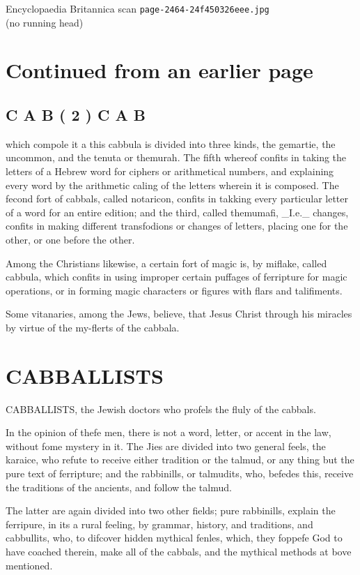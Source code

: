 \documentclass{article}
\begin{document}
\begin{center}
{\Large Encyclopaedia Britannica scan \texttt{page-2464-24f450326eee.jpg}}\\[0.5em]
(no running head)
\end{center}
\section*{Continued from an earlier page}
\subsection*{C A B ( 2 ) C A B}
which compole it a this cabbula is divided into three kinds, the gemartie, the uncommon, and the tenuta or themurah. The fifth whereof confits in taking the letters of a Hebrew word for ciphers or arithmetical numbers, and explaining every word by the arithmetic caling of the letters wherein it is composed. The fecond fort of cabbals, called notaricon, confits in takking every particular letter of a word for an entire edition; and the third, called themumafi, \_I.e.\_ changes, confits in making different transfodions or changes of letters, placing one for the other, or one before the other.

Among the Christians likewise, a certain fort of magic is, by miflake, called cabbula, which confits in using improper certain puffages of ferripture for magic operations, or in forming magic characters or figures with flars and talifiments.

Some vitanaries, among the Jews, believe, that Jesus Christ through his miracles by virtue of the my-flerts of the cabbala.

\section*{CABBALLISTS}
CABBALLISTS, the Jewish doctors who profels the fluly of the cabbals.

In the opinion of thefe men, there is not a word, letter, or accent in the law, without fome mystery in it. The Jies are divided into two general feels, the karaice, who refute to receive either tradition or the talmud, or any thing but the pure text of ferripture; and the rabbinills, or talmudits, who, befedes this, receive the traditions of the ancients, and follow the talmud.

The latter are again divided into two other fields; pure rabbinills, explain the ferripure, in its a rural feeling, by grammar, history, and traditions, and cabbullits, who, to difcover hidden mythical fenles, which, they foppefe God to have coached therein, make all of the cabbals, and the mythical methods at bove mentioned.
\end{document}
